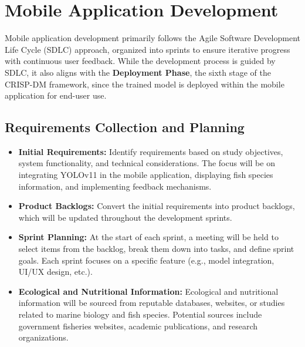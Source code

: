 \section{Mobile Application Development}
Mobile application development primarily follows the Agile Software Development Life Cycle (SDLC) approach, organized into sprints to ensure iterative progress with continuous user feedback. While the development process is guided by SDLC, it also aligns with the \textbf{Deployment Phase}, the sixth stage of the CRISP-DM framework, since the trained model is deployed within the mobile application for end-user use.

\subsection{Requirements Collection and Planning}
\begin{itemize}

 \item \textbf{Initial Requirements:} Identify requirements based on study objectives, system functionality, and technical considerations. The focus will be on integrating YOLOv11 in the mobile application, displaying fish species information, and implementing feedback mechanisms.
 
 \item \textbf{Product Backlogs:} Convert the initial requirements into product backlogs, which will be updated throughout the development sprints. 
 
 \item \textbf{Sprint Planning:} At the start of each sprint, a meeting will be held to select items from the backlog, break them down into tasks, and define sprint goals. Each sprint focuses on a specific feature (e.g., model integration, UI/UX design, etc.).
 
 \item \textbf{Ecological and Nutritional Information:} Ecological and nutritional information will be sourced from reputable databases, websites, or studies related to marine biology and fish species. Potential sources include government fisheries websites, academic publications, and research organizations.
\end{itemize}

